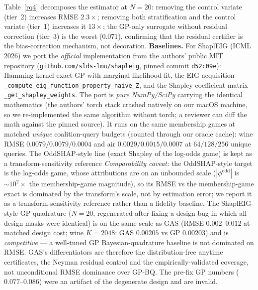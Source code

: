 \documentclass[11pt,twocolumn]{article}
\begin{document}
Table~\ref{rq4} decomposes the estimator at $N=20$: removing the control
variate (tier~2) increases RMSE $2.3\times$; removing both stratification
and the control variate (tier~1) increases it $13\times$; the GP-only
surrogate without residual correction (tier~3) is the worst ($0.071$),
confirming that the residual certifier is the bias-correction mechanism,
not decoration.  \textbf{Baselines.}  For ShaplEIG (ICML 2026) we port the
\emph{official} implementation from the authors' public MIT repository
(\texttt{github.com/slds-lmu/shapleig}, pinned commit \texttt{d52c09e}):
Hamming-kernel exact GP with marginal-likelihood fit, the EIG acquisition
\texttt{\_compute\_eig\_function\_property\_naive\_Z}, and the Shapley
coefficient matrix \texttt{\_get\_shapley\_weights}.  The port is
\emph{pure NumPy/SciPy} carrying the identical mathematics (the authors'
torch stack crashed natively on our macOS machine, so we re-implemented
the same algorithm without torch; a reviewer can diff the math against the
pinned source).  It runs on the same membership games at matched
\emph{unique} coalition-query budgets (counted through our oracle cache):
wine RMSE $0.0079/0.0079/0.0004$ and air $0.0029/0.0015/0.0007$ at $64/128/
256$ unique queries.  The OddSHAP-style line (exact Shapley of the log-odds
game) is kept as a transform-sensitivity reference
\emph{Comparability caveat:} the OddSHAP-style target is the log-odds game,
whose attributions are on an unbounded scale ($|\phi^{\mathrm{odd}}|$ is
$\sim10^2\times$ the membership-game magnitude), so its RMSE vs the
membership-game exact is dominated by the transform's scale, not by
estimation error; we report it as a transform-sensitivity reference rather
than a fidelity baseline.  The ShaplEIG-style GP quadrature ($N=20$,
regenerated after fixing a design bug in which all design masks were
identical) is on the same scale as GAS (RMSE $0.002$--$0.012$ at matched
design cost; wine $K{=}2048$: GAS $0.00205$ vs GP $0.00203$) and is
\emph{competitive} — a well-tuned GP Bayesian-quadrature baseline is not
dominated on RMSE.  GAS's differentiators are therefore the
distribution-free anytime certificates, the Neyman residual control and the
empirically-validated coverage, not unconditional RMSE dominance over
GP-BQ.  The pre-fix GP numbers ($0.077$--$0.086$) were an artifact of the
degenerate design and are invalid.
\end{document}
